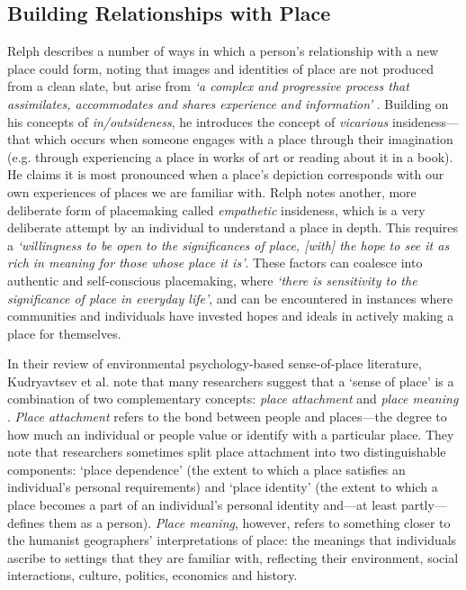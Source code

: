 \subsection{Building Relationships with Place}
Relph describes a number of ways in which a person's relationship with a new place could form, noting that images and identities of place are not produced from a clean slate, but arise from \textit{`a complex and progressive process that assimilates, accommodates and shares experience and information'} \citep{Relph2018}. Building on his concepts of \textit{in/outsideness}, he introduces the concept of \textit{vicarious} insideness---that which occurs when someone engages with a place through their imagination (e.g. through experiencing a place in works of art or reading about it in a book). He claims it is most pronounced when a place's depiction corresponds with our own experiences of places we are familiar with.  Relph notes another, more deliberate form of placemaking called \textit{empathetic} insideness, which is a very deliberate attempt by an individual to understand a place in depth. This requires a \textit{`willingness to be open to the significances of place, [with] the hope to see it as rich in meaning for those whose place it is'}. These factors can coalesce into authentic and self-conscious placemaking, where \textit{`there is sensitivity to the significance of place in everyday life'}, and can be encountered in instances where communities and individuals have invested hopes and ideals in actively making a place for themselves. 

In their review of environmental psychology-based sense-of-place literature, Kudryavtsev et al. note that many researchers suggest that a `sense of place' is a combination of two complementary concepts: \textit{place attachment} and \textit{place meaning} \citep{Kudryavtsev2012}. \textit{Place attachment} refers to the bond between people and places---the degree to how much an individual or people value or identify with a particular place. They note that researchers sometimes split place attachment into two distinguishable components: `place dependence' (the extent to which a place satisfies an individual's personal requirements) and `place identity' (the extent to which a place becomes a part of an individual's personal identity and---at least partly---defines them as a person). \textit{Place meaning}, however, refers to something closer to the humanist geographers' interpretations of place: the meanings that individuals ascribe to settings that they are familiar with, reflecting their environment, social interactions, culture, politics, economics and history. 

